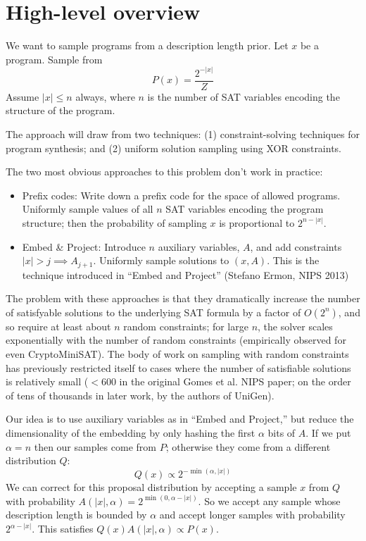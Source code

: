 \documentclass{article}
\begin{document}
\section{High-level overview}

We want to sample programs from a description length prior.
Let $x$ be a program. Sample from
\begin{equation}
  P(x) = \frac{2^{-|x|}}{Z}
\end{equation}
Assume $|x|\leq n$ always, where $n$ is the number of SAT variables encoding the structure of the program.

The approach will draw from two techniques: (1) constraint-solving techniques for program synthesis; and (2) uniform solution sampling using XOR constraints.

The two most obvious approaches to this problem don't work in practice:

\begin{itemize}
\item{Prefix codes}: Write down a prefix code for the space of allowed programs.
  Uniformly sample values of all $n$ SAT variables encoding the program structure;
  then the probability of sampling $x$ is proportional to $2^{n-|x|}$.
\item{Embed \& Project}: Introduce $n$ auxiliary variables, $A$,
  and add constraints $|x| > j\implies A_{j+1}$.
  Uniformly sample solutions to $(x,A)$.
  This is the technique introduced in ``Embed and Project'' (Stefano Ermon, NIPS 2013)
\end{itemize}

The problem with these approaches is that
they dramatically increase the number of satisfyable solutions to the underlying SAT formula by a factor of $O(2^n)$,
and so require at least about $n$ random constraints;
for large $n$, the solver scales exponentially with the number of random constraints (empirically observed for even CryptoMiniSAT).
The body of work on sampling with random constraints has previously restricted itself to cases where the number of satisfiable solutions is relatively small ($ < 600$ in the original Gomes et al. NIPS paper; on the order of tens of thousands in later work, by the authors of UniGen).

Our idea is to use auxiliary variables as in ``Embed and Project,'' but reduce the dimensionality of the embedding
by only hashing the first $\alpha$ bits of $A$.
If we put $\alpha = n$ then our samples come from $P$; otherwise they come from a different distribution $Q$:
\begin{equation}
  Q(x) \propto 2^{-\min (\alpha,|x| )}
  \end{equation}
We can correct for this proposal distribution by accepting a sample $x$ from $Q$ with probability $A(|x|,\alpha) = 2^{\min(0,\alpha - |x|)}$.
So we accept any sample whose description length is bounded by $\alpha$ and accept longer samples with probability $2^{\alpha - |x|}$.
This satisfies $Q(x)A(|x|,\alpha)\propto P(x)$.
\end{document}
